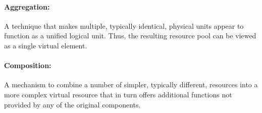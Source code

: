 \paragraph{Aggregation:} A technique that makes multiple, typically identical, physical units appear to function as a unified logical unit. Thus, the resulting resource pool can be viewed as a single virtual element.

\paragraph{Composition:} A mechanism to combine a number of simpler, typically different, resources into a more complex virtual resource that in turn offers additional functions not provided by any of the original components. 


